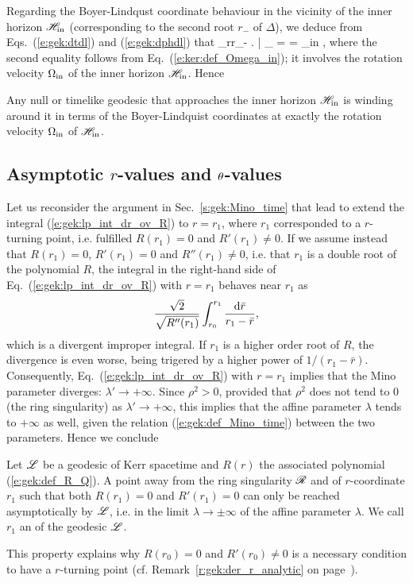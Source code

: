 Regarding the Boyer-Lindqust coordinate behaviour in the vicinity of the inner
horizon $\mathscr{H}_{\rm in}$ (corresponding to the second root $r_-$ of $\Delta$), we deduce
from
Eqs.~(\ref{e:gek:dtdl}) and
(\ref{e:gek:dphdl}) that
\be
    \lim_{r\to r_-} \left.  \right| _{\Li} =  = \Omega_{\rm in} ,
\ee
where the second equality follows from Eq.~(\ref{e:ker:def_Omega_in}); it involves
the rotation velocity $\Omega_{\rm in}$ of the inner horizon $\mathscr{H}_{\rm in}$.
Hence
\begin{greybox}
Any null or timelike geodesic that approaches the inner horizon $\mathscr{H}_{\rm in}$
is winding around it in terms of the Boyer-Lindquist coordinates at exactly the
rotation velocity $\Omega_{\rm in}$ of $\mathscr{H}_{\rm in}$.
\end{greybox}

\subsection{Asymptotic $r$-values and $\theta$-values} \label{s:gek:asymptotic_values}

Let us reconsider the argument in Sec.~\ref{s:gek:Mino_time}
that lead to extend the integral
(\ref{e:gek:lp_int_dr_ov_R}) to $r=r_1$, where $r_1$ corresponded to
a $r$-turning point, i.e. fulfilled $R(r_1)=0$ and $R'(r_1)\neq 0$.
If we assume instead that $R(r_1)=0$, $R'(r_1)=0$ and
$R''(r_1)\neq 0$, i.e. that $r_1$ is a double root of the polynomial $R$,
the integral in the right-hand side of Eq.~(\ref{e:gek:lp_int_dr_ov_R}) with $r=r_1$ behaves
near $r_1$ as
\[
    \frac{\sqrt{2}}{\sqrt{R''(r_1)}} \int_{r_0}^{r_1} \frac{\mathrm{d} \bar{r}}{r_1 - \bar{r}} ,
\]
which is a divergent improper integral. If $r_1$ is a higher order root of $R$,
the divergence is even worse, being trigered by a higher power of $1/(r_1 - \bar{r})$.
Consequently, Eq.~(\ref{e:gek:lp_int_dr_ov_R}) with $r=r_1$
implies that the Mino parameter diverges: $\lambda'\to +\infty$. Since $\rho^2 > 0$,
provided that $\rho^2$
does not tend to $0$ (the ring singularity) as $\lambda'\to +\infty$, this
implies that the affine parameter $\lambda$ tends to $+\infty$ as well, given
the relation (\ref{e:gek:def_Mino_time}) between the two parameters.
Hence we conclude
\begin{greybox}
Let $\mathscr{L}$ be a geodesic of Kerr spacetime and $R(r)$ the associated polynomial
(\ref{e:gek:def_R_Q}).
A point away from the ring singularity $\mathscr{R}$ and of $r$-coordinate $r_1$
such that both $R(r_1) = 0$ and $R'(r_1) = 0$
can only be reached asymptotically by $\mathscr{L}$, i.e. in the limit
$\lambda\to \pm\infty$ of the affine parameter
$\lambda$. We call $r_1$ an  of the geodesic $\mathscr{L}$.
\end{greybox}
This property explains why $R(r_0) = 0$ and $R'(r_0) \neq 0$ is a necessary condition
to have a $r$-turning point (cf. Remark~\ref{r:gek:der_r_analytic} on page~\pageref{r:gek:der_r_analytic}).

